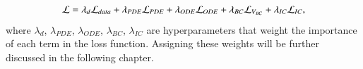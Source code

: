 \begin{equation}
\centering
        \mathcal{L} =\lambda_{d}\mathcal{L}_{d a t a}+\lambda_{PDE}\mathcal{L}_{PDE}+\lambda_{ODE}\mathcal{L}_{ODE}
        +\lambda_{BC}\mathcal{L}_{V_{B C}}+\lambda_{IC}\mathcal{L}_{{I C}},  
\label{eq:pinn_loss}
\end{equation}
where \(\lambda_{d}\), \(\lambda_{PDE}\), \(\lambda_{ODE}\), \(\lambda_{BC}\), \(\lambda_{IC}\) are hyperparameters that weight the importance of each term in the loss function. Assigning these weights will be further discussed in the following chapter.























